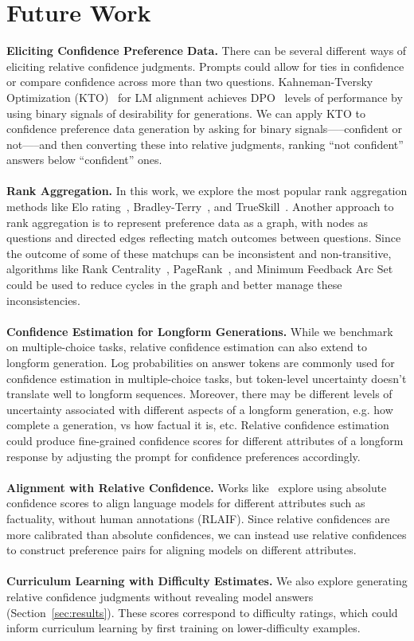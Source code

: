 \section{Future Work}
\noindent \textbf{Eliciting Confidence Preference Data.} There can be several different ways of eliciting relative confidence judgments. Prompts could allow for ties in confidence or compare confidence across more than two questions. Kahneman-Tversky Optimization (KTO)~\citep{Ethayarajh2024KTOMA} for LM alignment 
achieves DPO~\citep{Rafailov2023DirectPO} levels of performance by using binary signals of desirability for generations. We can apply KTO to confidence preference data generation by asking for binary signals—--confident or not—--and then converting these into relative judgments, ranking “not confident” answers below “confident” ones.\\\\
\noindent \textbf{Rank Aggregation.} In this work, we explore the most popular rank aggregation methods like Elo rating~\citep{elo_ratings}, Bradley-Terry~\citep{bradley_terry}, and TrueSkill~\citep{true_skill}. Another approach to rank aggregation is to represent preference data as a graph, with nodes as questions and directed edges reflecting match outcomes between questions. Since the outcome of some of these matchups can be inconsistent and non-transitive, algorithms like Rank Centrality~\citep{Negahban2012RankCR}, PageRank~\citep{Page1999ThePC}, and Minimum Feedback Arc Set~\citep{Vahidi2024MinimumWF} could be used to reduce cycles in the graph and better manage these inconsistencies.\\\\
\noindent \textbf{Confidence Estimation for Longform Generations.} While we benchmark on multiple-choice tasks, relative confidence estimation can also extend to longform generation. Log probabilities on answer tokens are commonly used for confidence estimation in multiple-choice tasks, but token-level uncertainty doesn't translate well to longform sequences. Moreover, there may be different levels of uncertainty associated with different aspects of a longform generation, e.g. how complete a generation, vs how factual it is, etc. Relative confidence estimation could produce fine-grained confidence scores for different attributes of a longform response by adjusting the prompt for confidence preferences accordingly.\\\\
\noindent \textbf{Alignment with Relative Confidence.} Works like~\cite{Tian2023FinetuningLM} explore using absolute confidence scores to align language models for different attributes such as factuality, without human annotations (RLAIF). Since relative confidences are more calibrated than absolute confidences, we can instead use relative confidences to construct preference pairs for aligning models on different attributes. \\\\
\noindent \textbf{Curriculum Learning with Difficulty Estimates.} We also explore generating relative confidence judgments without revealing model answers (Section~\ref{sec:results}). These scores correspond to difficulty ratings, which could inform curriculum learning by first training on lower-difficulty examples.